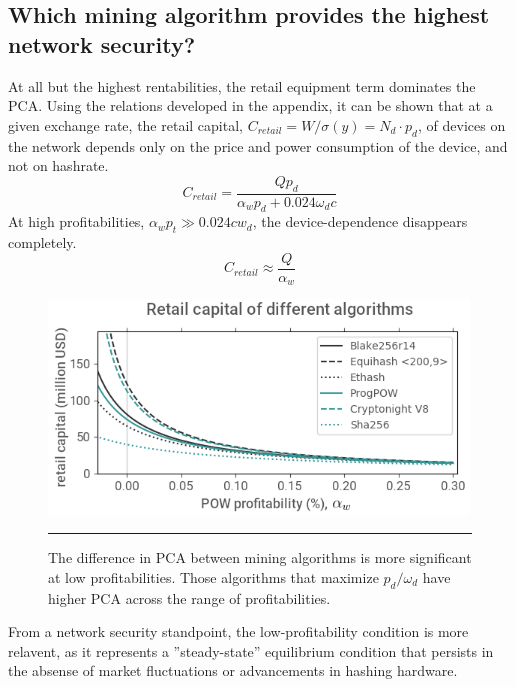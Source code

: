 \documentclass[a4paper,12pt]{article}
\begin{document}
\subsection{Which mining algorithm provides the highest network security? }

At all but the highest rentabilities, the retail equipment term dominates the PCA. Using the relations developed in the appendix, it can be shown that at a given exchange rate, the retail capital, $ C_{retail} = W / \sigma(y) = N_d \cdot p_d $, of devices on the network depends only on the price and power consumption of the device, and not on hashrate. 
%
\begin{equation}
C_{retail} = \frac{ Q p_d }{ \alpha_w p_d + 0.024 \omega_d c }
\end{equation}
%
At high profitabilities, $ \alpha_w p_t \gg 0.024 c w_d $, the device-dependence disappears completely.
%
\begin{equation}
C_{retail} \approx \frac{ Q }{ \alpha_w }
\end{equation}
%
\begin{figure}[t!]
\vspace{-10pt}
	\begin{center}
	\includegraphics[width=4.4in]{algo-pcoa}
\begin{minipage}[t]{0.85\textwidth}
	\caption{The difference in PCA between mining algorithms is more significant at low profitabilities. Those algorithms that maximize $ p_d / \omega_d $ have higher PCA across the range of profitabilities.}
	\end{minipage}
  	\end{center}
\hrule
\end{figure}
%

From a network security standpoint, the low-profitability condition is more relavent, as it represents a ''steady-state'' equilibrium condition that persists in the absense of market fluctuations or advancements in hashing hardware. 
\end{document}
